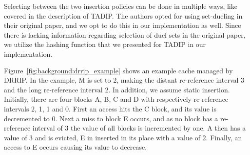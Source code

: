 Selecting between the two insertion policies can be done in multiple ways, like covered in the description of TADIP.
The authors opted for using set-dueling in their original paper, and we opt to do this in our implementation as well.
Since there is lacking information regarding selection of duel sets in the original paper, we utilize the hashing function that we presented for TADIP in our implementation.

Figure~\ref{fig:background:drrip_example} shows an example cache managed by DRRIP.
In the example, M is set to 2, making the distant re-reference interval 3 and the long re-reference interval 2. 
In addition, we assume static insertion.
Initially, there are four blocks A, B, C and D with respectively re-reference intervals 2, 1, 1 and 0.
First an access hits the C block, and its value is decremented to 0.
Next a miss to block E occurs, and as no block has a re-reference interval of 3 the value of all blocks is incremented by one. 
A then has a value of 3 and is evicted, E in inserted in its place with a value of 2.
Finally, an access to E occurs causing its value to decrease.


